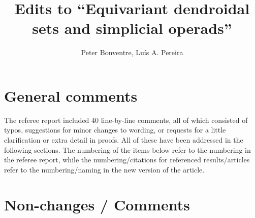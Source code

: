 \documentclass[a4paper,10pt
]{article}%
\title{Edits to ``Equivariant dendroidal sets and simplicial operads''}
\author{Peter Bonventre, Lu\'is A. Pereira}%
\numberwithin{equation}{section}
\numberwithin{figure}{section}
\theoremstyle{definition} %
\newcommand{\1}{\ensuremath{\mathbbm 1}}%
\begin{document}
 
  
\maketitle
 



\section{General comments}

The referee report included 40 line-by-line comments, 
all of which consisted of
typos,
suggestions for minor changes to wording,
or requests for a little clarification or extra detail in proofs.
All of these have been addressed in the following sections.
The numbering of the items below refer to the numbering in the referee report,
while the numbering/citations for referenced results/articles refer to the numbering/naming in the new version of the article.

      

\section{Non-changes / Comments}
\end{document}

